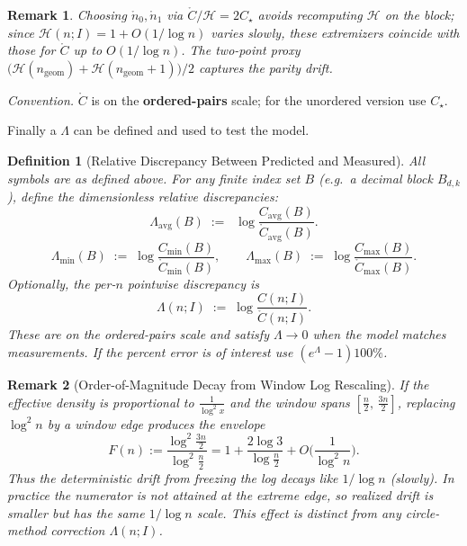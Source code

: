 \documentclass[11pt]{article}
\theoremstyle{inline}
\newtheorem*{remark}{Remark}
\theoremstyle{break}
\theoremstyle{break}
\theoremstyle{break}
\theoremstyle{break}
\theoremstyle{break}
\theoremstyle{break}
\theoremstyle{break}
\newtheorem{definition}{Definition}
\theoremstyle{inline}
\newcommand{\tavg}{{\scriptscriptstyle\mathrm{avg}}}
\newcommand{\Cmeas}{C}              %
\newcommand{\Cpred}{\mathring{C}}   %
\newcommand{\Npred}{\mathring{n}}   %
\newcommand{\Ngeom}{n_\mathrm{geom}}
\newcommand{\HLCorr}{\mathcal{H}}
\begin{document}
\begin{remark}
Choosing \(\Npred_0,\Npred_1\) via \(\Cpred/\HLCorr = 2C_\star\) avoids recomputing \(\HLCorr\) on the block; since
\(\HLCorr(n;I)=1+O(1/\log n)\) varies slowly, these extremizers coincide with those for \(\Cpred\) up to \(O(1/\log n)\).
The two-point proxy \(\big(\HLCorr(\Ngeom)+\HLCorr(\Ngeom+1)\big)/2\) captures the parity drift.
\end{remark}

\noindent\emph{Convention.} \(\Cpred\) is on the \textbf{ordered-pairs} scale; for the unordered version use \(C_\star\).

Finally a \( \Lambda \) can be defined and used to test the model.

\begin{definition}[Relative Discrepancy Between Predicted and Measured]
\label{def:lambda}
All symbols are as defined above. For any finite index set \(B\) (e.g.\ a decimal block \(B_{d,k}\)),
define the dimensionless relative discrepancies:
\begin{equation}
\Lambda_{\tavg}(B)\;:=\;\;\log{\frac{\Cmeas_{\tavg}(B)}{\Cpred_{\tavg}(B)}}.
\end{equation}
\begin{equation}
\Lambda_{\min}(B)\;:=\;\log{\frac{\Cmeas_{\min}(B)}{\Cpred_{\min}(B)}},
\qquad
\Lambda_{\max}(B)\;:=\;\log{\frac{\Cmeas_{\max}(B)}{\Cpred_{\max}(B)}}.
\end{equation}
Optionally, the per-\(n\) pointwise discrepancy is
\begin{equation}
\Lambda(n;I)\;:=\;\log{\frac{\Cmeas(n;I)}{\Cpred(n;I)}}.
\end{equation}
These are on the ordered-pairs scale and satisfy \(\Lambda\to 0\) when the model matches measurements.
If the percent error is of interest use \( \left( e^{\Lambda} - 1 \right) 100\% \).
\end{definition}

\begin{remark}[Order-of-Magnitude Decay from Window Log Rescaling]
If the effective density is proportional to \(\frac{1}{\log^2{x}}\) and the window spans
\(\left[\frac{n}{2},\,\frac{3n}{2}\right]\), replacing \(\log^2 n\) by a window edge produces the envelope
\begin{equation}
F(n):=\frac{\log^2{\frac{3n}{2}}}{\log^2{\frac{n}{2}}}
=1+\frac{2\log 3}{\log{\frac{n}{2}}}+O\!\Big(\frac{1}{\log^2 n}\Big).
\end{equation}
Thus the deterministic drift from freezing the log decays like \(1/\log n\) (slowly).
In practice the numerator is not attained at the extreme edge, so realized drift
is smaller but has the same \(1/\log n\) scale. This effect is distinct from any
circle-method correction \(\Lambda(n;I)\).
\end{remark}
\end{document}
